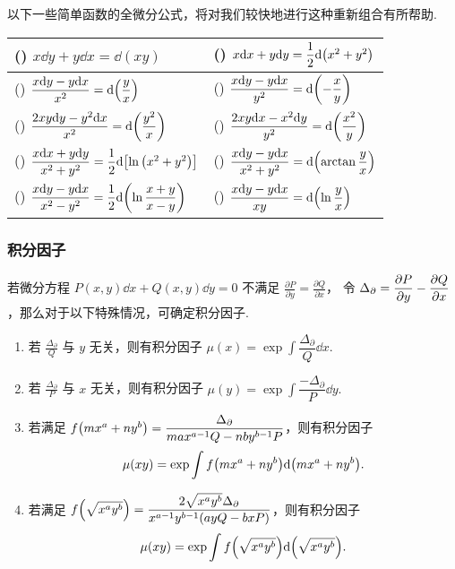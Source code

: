以下一些简单函数的全微分公式，将对我们较快地进行这种重新组合有所帮助.
\setcounter{magicrownumbers}{0}
\begin{table}[H]
    \centering
    \begin{tabular}{l l}
        (\rownumber{}) $x\dd y+y\dd x=\dd (xy)$                                                   & (\rownumber{}) $x\dd x+y\dd y=\dfrac{1}{2}\dd \qty(x^2+y^2)$                 \\
        \midrule
        (\rownumber{}) $\dfrac{x\dd y-y\dd x}{x^2}=\dd \qty(\dfrac{y}{x})$                        & (\rownumber{}) $\dfrac{x\dd y-y\dd x}{y^2}=\dd \qty(-\dfrac{x}{y})$          \\
        (\rownumber{}) $\dfrac{2xy\dd y-y^2\dd x}{x^2}=\dd\qty(\dfrac{y^2}{x})$                   & (\rownumber{}) $\dfrac{2xy\dd x-x^2\dd y}{y^2}=\dd \qty(\dfrac{x^2}{y})$     \\
        \midrule
        (\rownumber{}) $\dfrac{x\dd x+y\dd y}{x^2+y^2}=\dfrac{1}{2}\dd \qty[\ln\qty(x^2+y^2)]$    & (\rownumber{}) $\dfrac{x\dd y-y\dd x}{x^2+y^2}=\dd\qty(\arctan\dfrac{y}{x})$ \\
        (\rownumber{}) $\dfrac{x\dd y-y\dd x}{x^2-y^2}=\dfrac{1}{2}\dd \qty(\ln\dfrac{x+y}{x-y})$ & (\rownumber{}) $\dfrac{x\dd y-y\dd x}{xy}=\dd \qty(\ln\dfrac{y}{x})$         \\
    \end{tabular}
\end{table}

\subsubsection{积分因子}

\begin{theorem}[积分因子]
    若微分方程 $P(x,y)\dd x+Q(x,y)\dd y=0$ 不满足 $\displaystyle\frac{\partial P}{\partial y}=\frac{\partial Q}{\partial x}$，
    令 $\Delta _\partial=\displaystyle\pdv{P}{y}-\pdv{Q}{x}$，那么对于以下特殊情况，可确定积分因子.
    \begin{enumerate}[label=(\arabic{*})]
        \item 若 $\displaystyle\frac{\Delta _\partial}{Q}$ 与 $y$ 无关，则有积分因子 $\displaystyle\mu(x)=\exp\int\dfrac{\Delta_\partial}{Q}\dd x.$
        \item 若 $\displaystyle\frac{\Delta _\partial}{P}$ 与 $x$ 无关，则有积分因子 $\displaystyle\mu(y)=\exp\int\dfrac{-\Delta_\partial}{P}\dd y.$
        \item 若满足 $f\qty(mx^a+ny^b)=\dfrac{\Delta _\partial}{max^{a-1}Q-nby^{b-1}P}$，则有积分因子 $$\mu(xy)=\exp\int f\qty(mx^a+ny^b)\dd \qty(mx^a+ny^b).$$
        \item 若满足 $f\qty(\sqrt{x^ay^b})=\dfrac{2\sqrt{x^ay^b}\Delta_\partial}{x^{a-1}y^{b-1}(ayQ-bxP)}$，则有积分因子
              $$\mu(xy)=\exp\int f\qty(\sqrt{x^ay^b})\dd \qty(\sqrt{x^ay^b}).$$
    \end{enumerate}
\end{theorem}

